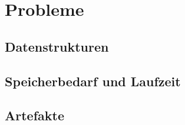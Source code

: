\section{Probleme}

\subsection{Datenstrukturen}

\subsection{Speicherbedarf und Laufzeit}
\label{speicher}

\subsection{Artefakte}

